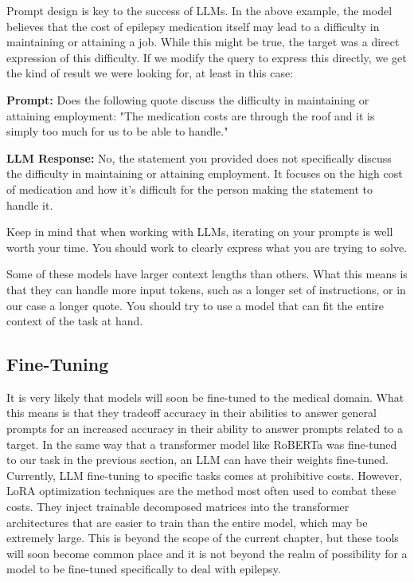 Prompt design is key to the success of LLMs. In the above example, the model believes that the cost of epilepsy medication itself may lead to a difficulty in maintaining or attaining a job. While this might be true, the target was a direct expression of this difficulty.
If we modify the query to express this directly, we get the kind of result we were looking for, at least in this case:

\begin{displayquote}
  \textbf{Prompt:} Does the following quote discuss the difficulty in maintaining or attaining employment: "The medication costs are through the roof and it is simply too much for us to be able to handle."
\end{displayquote}

\begin{displayquote}
  \textbf{LLM Response:} No, the statement you provided does not specifically discuss the difficulty in maintaining or attaining employment. It focuses on the high cost of medication and how it's difficult for the person making the statement to handle it.
\end{displayquote}

Keep in mind that when working with LLMs, iterating on your prompts is well worth your time. You should work to clearly express what you are trying to solve.

Some of these models have larger context lengths than others. What this means is that they can handle more input tokens, such as a longer set of instructions, or in our case a longer quote.
You should try to use a model that can fit the entire context of the task at hand.

\subsection{Fine-Tuning}

It is very likely that models will soon be fine-tuned to the medical domain. What this means is that they tradeoff accuracy in their abilities to answer general prompts for an increased accuracy in their ability to answer prompts related to a target.
In the same way that a transformer model like RoBERTa was fine-tuned to our task in the previous section, an LLM can have their weights fine-tuned.
Currently, LLM fine-tuning to specific tasks comes at prohibitive costs. However, LoRA\cite{hu2021lora} optimization techniques are the method most often used to combat these costs. They inject trainable decomposed matrices into the transformer architectures that
are easier to train than the entire model, which may be extremely large.
This is beyond the scope of the current chapter, but these tools will soon become common place and it is not beyond the realm of possibility for a model to be fine-tuned specifically to deal with
epilepsy.

